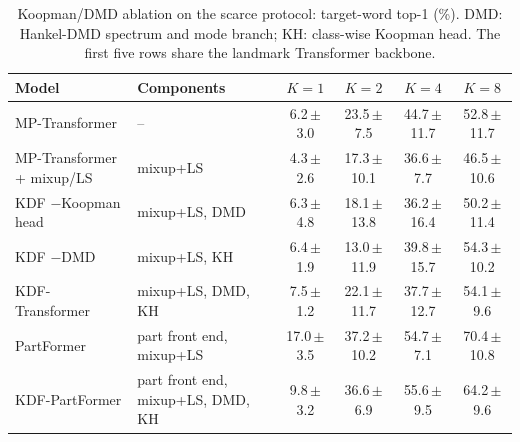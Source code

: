 \begin{table}[t]
\centering
\small
\caption{Koopman/DMD ablation on the scarce protocol: target-word top-1 (\%). DMD: Hankel-DMD spectrum and mode branch; KH: class-wise Koopman head. The first five rows share the landmark Transformer backbone.}
\label{tab:kdf}
\footnotesize
\setlength{\tabcolsep}{4pt}
\begin{tabular}{l>{\raggedright\arraybackslash}p{2.9cm}cccc}
\toprule
Model & Components & $K=1$ & $K=2$ & $K=4$ & $K=8$ \\
\midrule
MP-Transformer & -- & 6.2\,{\scriptsize$\pm$3.0} & 23.5\,{\scriptsize$\pm$7.5} & 44.7\,{\scriptsize$\pm$11.7} & 52.8\,{\scriptsize$\pm$11.7} \\
MP-Transformer + mixup/LS & mixup+LS & 4.3\,{\scriptsize$\pm$2.6} & 17.3\,{\scriptsize$\pm$10.1} & 36.6\,{\scriptsize$\pm$7.7} & 46.5\,{\scriptsize$\pm$10.6} \\
KDF $-$Koopman head & mixup+LS, DMD & 6.3\,{\scriptsize$\pm$4.8} & 18.1\,{\scriptsize$\pm$13.8} & 36.2\,{\scriptsize$\pm$16.4} & 50.2\,{\scriptsize$\pm$11.4} \\
KDF $-$DMD & mixup+LS, KH & 6.4\,{\scriptsize$\pm$1.9} & 13.0\,{\scriptsize$\pm$11.9} & 39.8\,{\scriptsize$\pm$15.7} & 54.3\,{\scriptsize$\pm$10.2} \\
KDF-Transformer & mixup+LS, DMD, KH & 7.5\,{\scriptsize$\pm$1.2} & 22.1\,{\scriptsize$\pm$11.7} & 37.7\,{\scriptsize$\pm$12.7} & 54.1\,{\scriptsize$\pm$9.6} \\
\midrule
PartFormer & part front end, mixup+LS & 17.0\,{\scriptsize$\pm$3.5} & 37.2\,{\scriptsize$\pm$10.2} & 54.7\,{\scriptsize$\pm$7.1} & 70.4\,{\scriptsize$\pm$10.8} \\
KDF-PartFormer & part front end, mixup+LS, DMD, KH & 9.8\,{\scriptsize$\pm$3.2} & 36.6\,{\scriptsize$\pm$6.9} & 55.6\,{\scriptsize$\pm$9.5} & 64.2\,{\scriptsize$\pm$9.6} \\
\bottomrule
\end{tabular}
\end{table}
